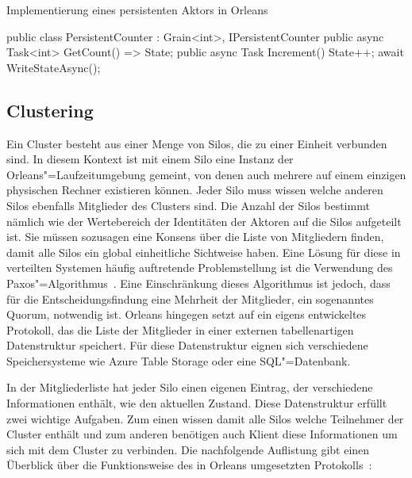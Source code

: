 \begin{program}[!hbt]
\caption{Implementierung eines persistenten Aktors in Orleans}
\label{prog:orleans-persistent-actor}
\begin{CsCode}
[StorageProvider(ProviderName="<provider-name>")]
public class PersistentCounter : Grain<int>, IPersistentCounter   {
	public async Task<int> GetCount() => State;
	public async Task Increment() {
		State++;
		await WriteStateAsync();
	}
}
\end{CsCode}
\end{program}

\subsection{Clustering}

Ein Cluster besteht aus einer Menge von Silos, die zu einer Einheit verbunden sind. In diesem Kontext ist mit einem Silo eine Instanz der Orleans"=Laufzeitumgebung gemeint, von denen auch mehrere auf einem einzigen physischen Rechner existieren können. Jeder Silo muss wissen welche anderen Silos ebenfalls Mitglieder des Clusters sind. Die Anzahl der Silos bestimmt nämlich wie der  Wertebereich der Identitäten der Aktoren auf die Silos aufgeteilt ist. Sie müssen sozusagen eine Konsens über die Liste von Mitgliedern finden, damit alle Silos ein global einheitliche Sichtweise haben. Eine Lösung für diese in verteilten Systemen häufig auftretende Problemstellung ist die Verwendung des Paxos"=Algorithmus~\cite{Lamport:1998:PP:279227.279229}. Eine Einschränkung dieses Algorithmus ist jedoch, dass für die Entscheidungsfindung eine Mehrheit der Mitglieder, ein sogenanntes Quorum, notwendig ist. Orleans hingegen setzt auf ein eigens entwickeltes Protokoll, das die Liste der Mitglieder in einer externen tabellenartigen Datenstruktur speichert. Für diese Datenstruktur eignen sich verschiedene Speichersysteme wie \zB  Azure Table Storage oder eine SQL"=Datenbank.

In der Mitgliederliste hat jeder Silo einen eigenen Eintrag, der verschiedene Informationen enthält, wie \zB den aktuellen Zustand. Diese Datenstruktur erfüllt zwei wichtige Aufgaben. Zum einen wissen damit alle Silos welche Teilnehmer der Cluster enthält und zum anderen benötigen auch Klient diese Informationen um sich mit dem Cluster zu verbinden. Die nachfolgende Auflistung gibt einen Überblick über die Funktionsweise des in Orleans umgesetzten Protokolls~\cite{Bernstein2014}:


